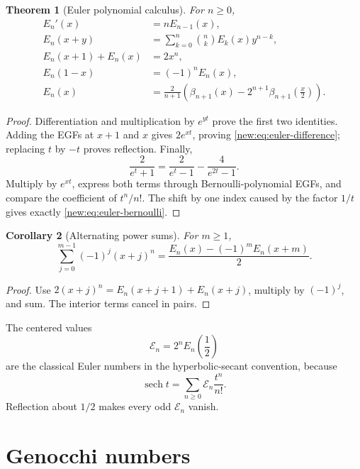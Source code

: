 \documentclass[11pt,a4paper,oneside,openany]{book}
\newtheorem{theorem}{Theorem}[chapter]
\newtheorem{corollary}[theorem]{Corollary}
\theoremstyle{definition}
\theoremstyle{remark}
\begin{document}
\begin{theorem}[Euler polynomial calculus]
For $n\ge0$,
\begin{align}
 E_n'(x)&=nE_{n-1}(x),
 \label{new:eq:euler-appell}\\
 E_n(x+y)&=\sum_{k=0}^n\binom nkE_k(x)y^{n-k},
 \label{new:eq:euler-addition}\\
 E_n(x+1)+E_n(x)&=2x^n,
 \label{new:eq:euler-difference}\\
 E_n(1-x)&=(-1)^nE_n(x),
 \label{new:eq:euler-reflection}\\
 E_n(x)&=\frac{2}{n+1}
 \left(\beta_{n+1}(x)-2^{n+1}\beta_{n+1}\!\left(\frac x2\right)\right).
 \label{new:eq:euler-bernoulli}
\end{align}
\end{theorem}

\begin{proof}
Differentiation and multiplication by $e^{yt}$ prove the first two identities.
Adding the EGFs at $x+1$ and $x$ gives $2e^{xt}$, proving
\eqref{new:eq:euler-difference}; replacing $t$ by $-t$ proves reflection.
Finally,
\[
 \frac{2}{e^t+1}=\frac{2}{e^t-1}-\frac{4}{e^{2t}-1}.
\]
Multiply by $e^{xt}$, express both terms through Bernoulli-polynomial EGFs, and
compare the coefficient of $t^n/n!$.  The shift by one index caused by the
factor $1/t$ gives exactly \eqref{new:eq:euler-bernoulli}.
\end{proof}

\begin{corollary}[Alternating power sums]
For $m\ge1$,
\begin{equation}
 \sum_{j=0}^{m-1}(-1)^j(x+j)^n
 =\frac{E_n(x)-(-1)^mE_n(x+m)}{2}.
 \label{new:eq:alternating-power-sum}
\end{equation}
\end{corollary}

\begin{proof}
Use $2(x+j)^n=E_n(x+j+1)+E_n(x+j)$, multiply by $(-1)^j$, and sum.  The
interior terms cancel in pairs.
\end{proof}

The centered values
\[
 \mathcal E_n=2^nE_n\!\left(\frac12\right)
\]
are the classical Euler numbers in the hyperbolic-secant convention, because
\[
 \operatorname{sech}t=\sum_{n\ge0}\mathcal E_n\frac{t^n}{n!}.
\]
Reflection about $1/2$ makes every odd $\mathcal E_n$ vanish.

\section{Genocchi numbers}
\end{document}
